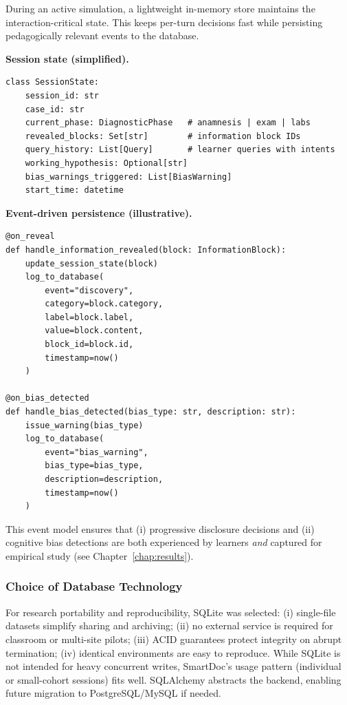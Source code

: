During an active simulation, a lightweight in-memory store maintains the
interaction-critical state. This keeps per-turn decisions fast while persisting
pedagogically relevant events to the database.

\noindent\textbf{Session state (simplified).}
\begin{verbatim}
class SessionState:
    session_id: str
    case_id: str
    current_phase: DiagnosticPhase   # anamnesis | exam | labs
    revealed_blocks: Set[str]        # information block IDs
    query_history: List[Query]       # learner queries with intents
    working_hypothesis: Optional[str]
    bias_warnings_triggered: List[BiasWarning]
    start_time: datetime
\end{verbatim}

\noindent\textbf{Event-driven persistence (illustrative).}
\begin{verbatim}
@on_reveal
def handle_information_revealed(block: InformationBlock):
    update_session_state(block)
    log_to_database(
        event="discovery",
        category=block.category,
        label=block.label,
        value=block.content,
        block_id=block.id,
        timestamp=now()
    )

@on_bias_detected
def handle_bias_detected(bias_type: str, description: str):
    issue_warning(bias_type)
    log_to_database(
        event="bias_warning",
        bias_type=bias_type,
        description=description,
        timestamp=now()
    )
\end{verbatim}

This event model ensures that (i) progressive disclosure decisions and
(ii) cognitive bias detections are both experienced by learners \emph{and}
captured for empirical study (see Chapter~\ref{chap:results}).

\subsubsection{Choice of Database Technology}

For research portability and reproducibility, SQLite was selected:
(i) single-file datasets simplify sharing and archiving;
(ii) no external service is required for classroom or multi-site pilots;
(iii) ACID guarantees protect integrity on abrupt termination;
(iv) identical environments are easy to reproduce. While SQLite is not intended
for heavy concurrent writes, SmartDoc’s usage pattern (individual or small-cohort
sessions) fits well. SQLAlchemy abstracts the backend, enabling future migration
to PostgreSQL/MySQL if needed.


